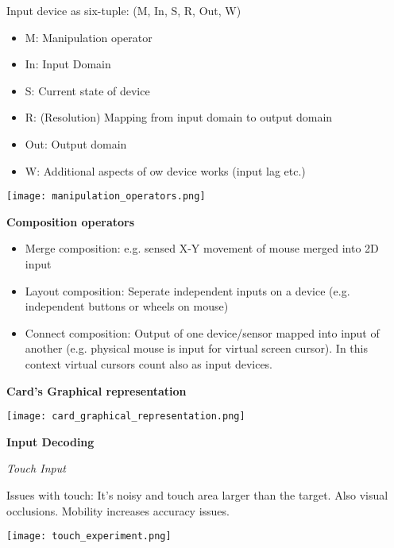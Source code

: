 Input device as six-tuple: (M, In, S, R, Out, W)

\begin{multicols}{2}
    \begin{itemize}[itemsep=-5pt, topsep=0pt, leftmargin=*]
	\item M: Manipulation operator
	\item In: Input Domain
	\item S: Current state of device
	\item R: (Resolution) Mapping from input domain to output domain
	\item Out: Output domain
	\item W: Additional aspects of ow device works (input lag etc.)
	\end{itemize}
\end{multicols}


\begin{center}
	\texttt{[image: manipulation\_operators.png]}
\end{center}

\textbf{Composition operators} \smallskip

\begin{itemize}[itemsep=-5pt, topsep=0pt, leftmargin=*]
	\item Merge composition: e.g. sensed X-Y movement of mouse merged into 2D input
	\item Layout composition: Seperate independent inputs on a device (e.g. independent buttons or wheels on mouse)
	\item Connect composition: Output of one device/sensor mapped into input of another (e.g. physical mouse is input for virtual screen cursor). In this context virtual cursors count also as input devices. 
\end{itemize}

\textbf{Card's Graphical representation} \smallskip


\begin{center}
	\texttt{[image: card\_graphical\_representation.png]}
\end{center}


\textbf{Input Decoding} \smallskip

\textit{Touch Input} \smallskip

Issues with touch: It's noisy and touch area larger than the target. Also visual occlusions. Mobility increases accuracy issues. 

\begin{center}
	\texttt{[image: touch\_experiment.png]}
\end{center}

